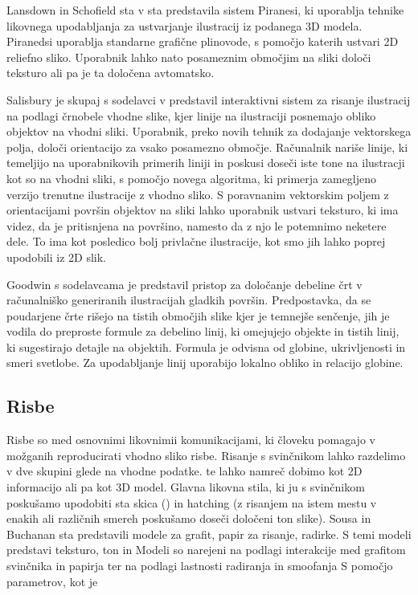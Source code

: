 Lansdown in Schofield sta v \cite{Lansdown:Expressive} sta predstavila sistem Piranesi, ki uporablja tehnike likovnega upodabljanja za ustvarjanje ilustracij iz podanega 3D modela. Piranedsi uporablja standarne grafične plinovode, %
s pomočjo katerih ustvari 2D reliefno sliko. Uporabnik lahko nato posameznim območjim na sliki določi teksturo ali pa je ta določena avtomatsko.

Salisbury je skupaj s sodelavci v \cite{Salisbury:OrientableTextures} predstavil interaktivni sistem za risanje ilustracij na podlagi črnobele vhodne slike, kjer linije na ilustraciji posnemajo obliko objektov na vhodni sliki. Uporabnik, preko novih tehnik za dodajanje vektorskega polja, določi orientacijo za vsako posamezno območje. Računalnik nariše linije, ki temeljijo na uporabnikovih primerih liniji in poskusi doseči iste tone na ilustracji kot so na vhodni sliki, s pomočjo novega algoritma, ki primerja zamegljeno verzijo trenutne ilustracije z vhodno sliko. S poravnanim vektorskim poljem z orientacijami površin objektov na sliki lahko uporabnik ustvari teksturo, ki ima videz, da je pritisnjena na površino, namesto da z njo le potemnimo neketere dele. To ima kot posledico bolj privlačne ilustracije, kot smo jih lahko poprej upodobili iz 2D slik.

Goodwin \cite{Goodwin:IsophoteDistance} s sodelavcama je predstavil pristop za določanje debeline črt v računalniško generiranih ilustracijah gladkih površin. Predpostavka, da se poudarjene črte rišejo na tistih območjih slike kjer je temnejše senčenje, jih je vodila do preproste formule za debelino linij, ki omejujejo objekte in tistih linij, ki sugestirajo detajle na objektih. Formula je odvisna od globine, ukrivljenosti in smeri svetlobe. Za upodabljanje linij uporabijo lokalno obliko in relacijo globine.

\subsection{Risbe}
Risbe so med osnovnimi likovnimii komunikacijami, ki človeku pomagajo v možganih reproducirati vhodno sliko risbe. Risanje s svinčnikom lahko razdelimo v dve skupini glede na vhodne podatke. te lahko namreč dobimo kot 2D informacijo ali pa kot 3D model. Glavna likovna stila, ki ju s svinčnikom poskušamo upodobiti sta skica ()%
in hatching (z risanjem na istem mestu v enakih ali različnih smereh poskušamo doseči določeni ton slike). %
Sousa in Buchanan \cite{Sousa:Model} sta predstavili modele za grafit, papir za risanje, radirke. S temi modeli predstavi  teksturo, ton in %
Modeli so narejeni na podlagi interakcije med grafitom svinčnika in papirja ter na podlagi lastnosti radiranja in smoofanja %
S pomočjo parametrov, kot je %


